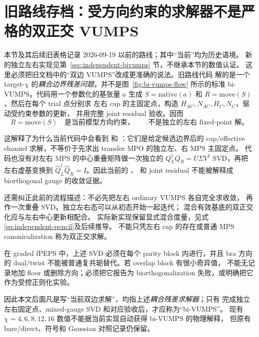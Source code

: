 

\section{旧路线存档：受方向约束的求解器不是严格的双正交 VUMPS}
\label{sec:biorthogonal-correction}

本节及其后续旧表格记录 2026-09-19 以前的路线；其中“当前”均为历史语境。
新的独立左右实现见第~\ref{sec:independent-bivumps} 节，不继承本节的数值认证。
这里必须把旧文档中的“双边 VUMPS”改成更准确的说法。旧路线代码
 解的是一个
target-$\chi$ 的\emph{耦合边界残差问题}，并不是图~\ref{fig:bi-vumps-flow}
所示的标准 bi-VUMPS。代码用一个参数化的基张量 $a$ 生成
$S=\mathrm{native}(a)$ 和 $R=\mathrm{move}(S)$，然后在每个 trial 点分别求
左右 cap 的主固定点，构造 $H_{AC},N_{AC},H_C,N_C$，驱动受约束参数的更新，
并用完整 joint residual 验收。因而
\begin{equation}
  R=\mathrm{move}(S)\quad\text{是当前模型方向约束，}
  \qquad\text{不是独立的左右 fixed-point 解。}
\end{equation}

这解释了为什么当前代码中会看到
 和
：它们是给定候选边界后的 cap/effective
channel 求解，不等价于先求出 transfer MPO 的独立左、右 MPS 主固定点。
代码也没有对左右 MPS 的中心重叠矩阵做一次独立的
$Q_L^\dagger Q_R=U\Sigma V^\dagger$ SVD，再把左右虚基变换到
$\widehat Q_L^\dagger\widehat Q_R=I$。因此当前的
、 和 joint residual
不能被解释成 biorthogonal gauge 的收敛证据。

还需纠正此前的流程描述：不必先把左右 ordinary VUMPS 各自完全求收敛，
再作一次重叠 SVD。独立左右态可以从初态开始一起迭代；
混合有效基底的双正交化应与左右中心更新相配合。
实际新实现保留显式混合度量，见式\eqref{eq:independent-pencil}及后续推导。
不能只凭左右 cap 的存在或普通 MPS canonicalization 称为双正交求解。

在 graded fPEPS 中，上述 SVD 必须在每个 parity block 内进行，并且 bra
方向的 dual/twist 不能被普通复共轭替代。若 overlap block 有很小奇异值，
不能无记录地加 floor 或删除方向；必须把它报告为 biorthogonalization
失败，或明确把它作为受控正则化实验。

因此本文后面凡是写“当前双边求解”，均指上述\emph{耦合残差求解器}；只有
完成独立左右固定点、mixed-gauge SVD 和对应验收后，才应称为“bi-VUMPS”。
现有 $\chi=4,6,8,12,16$ 数值不能据当前实现自动获得 bi-VUMPS 的物理解释，
但原有 bare/direct、符号和 Gaussian 对照记录仍保留。

